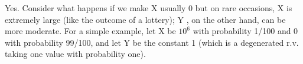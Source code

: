 
\setcounter{theorem}{12}
\begin{exercise} [BH.4.13]
\begin{solution}
    Yes. Consider what happens if we make X usually 0 but on rare occasions, X is extremely large (like the outcome of a lottery); Y , on the other hand, can be more moderate. For a simple example, let X be $10^6$ with probability 1/100 and 0 with probability 99/100, and let Y be the constant 1 (which is a degenerated r.v. taking one value with probability one). 
\end{solution}
\end{exercise}

